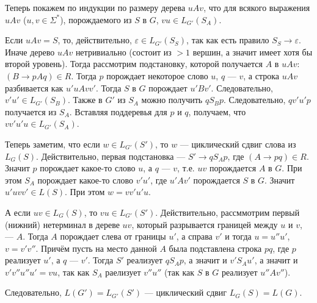 \documentclass[12pt,a4paper]{article}
\begin{document}
\begin{problem}{5}
        Теперь покажем по индукции по размеру дерева $uAv$, что для всякого выражения $uAv$ ($u, v \in \Sigma^*$), порождаемого из $S$ в $G$, $vu \in L_{G'}(S_A)$.

        Если $uAv = S$, то, действительно, $\varepsilon \in L_{G'}(S_S)$, так как есть правило $S_S \to \varepsilon$. Иначе дерево $uAv$ нетривиально (состоит из $>1$ вершин, а значит имеет хотя бы второй уровень). Тогда рассмотрим подстановку, которой получается $A$ в $uAv$: $(B \to pAq) \in R$. Тогда $p$ порождает некоторое слово $u$, $q$ --- $v$, а строка $uAv$ разбивается как $u'uAvv'$. Тогда $S$ в $G$ порождает $u'Bv'$. Следовательно, $v'u' \in L_{G'}(S_B)$. Также в $G'$ из $S_A$ можно получить $q S_B p$. Следовательно, $q v'u' p$ получается из $S_A$. Вставляя поддеревья для $p$ и $q$, получаем, что $vv'u'u \in L_{G'}(S_A)$.

        Теперь заметим, что если $w \in L_{G'}(S')$, то $w$ --- циклический сдвиг слова из $L_G(S)$. Действительно, первая подстановка --- $S' \to q S_A p$, где $(A \to pq) \in R$. Значит $p$ порождает какое-то слово $u$, а $q$ --- $v$, т.е. $uv$ порождается $A$ в $G$. При этом $S_A$ порождает какое-то слово $v'u'$, где $u'Av'$ порождается $S$ в $G$. Значит $u'uvv' \in L(S)$. При этом $w = vv'u'u$.

        А если $uv \in L_G(S)$, то $vu \in L_{G'}(S')$. Действительно, рассммотрим первый (нижний) нетерминал в дереве $uv$, который разрывается границей между $u$ и $v$, --- $A$. Тогда $A$ порождает слева от границы $u'$, а справа $v'$ и тогда $u = u'' u'$, $v = v' v''$. Причём пусть на место данной $A$ была подставлена строка $pq$, где $p$ реализует $u'$, а $q$ --- $v'$. Тогда $S'$ реализует $q S_A p$, а значит и $v' S_A u'$, а значит и $v' v'' u'' u' = vu$, так как $S_A$ раелизует $v'' u''$ (так как $S$ в $G$ реализует $u'' A v''$).

        Следовательно, $L(G') = L_{G'}(S')$ --- циклический сдвиг $L_G(S) = L(G)$.
    \end{problem}
\end{document}
